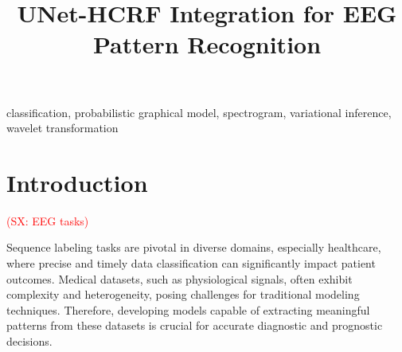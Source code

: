 \documentclass[conference]{IEEEtran}
\newcommand{\sx}[1]{\textcolor{red}{(SX: #1)}}
\begin{document}
\title{\huge UNet-HCRF Integration for EEG Pattern Recognition}

\author{
\and
{}
\and
{}
}

\maketitle


\begin{abstract}




\end{abstract}


\begin{IEEEkeywords}


classification, probabilistic graphical model, spectrogram,
variational inference, wavelet transformation


\end{IEEEkeywords}


\section{Introduction}


\sx{EEG tasks}

Sequence labeling tasks are pivotal in diverse domains, especially healthcare,
where precise and timely data classification can significantly impact patient
outcomes. Medical datasets, such as physiological signals, often exhibit
complexity and heterogeneity, posing challenges for traditional modeling
techniques. Therefore, developing models capable of extracting meaningful
patterns from these datasets is crucial for accurate diagnostic and prognostic
decisions.
\end{document}
